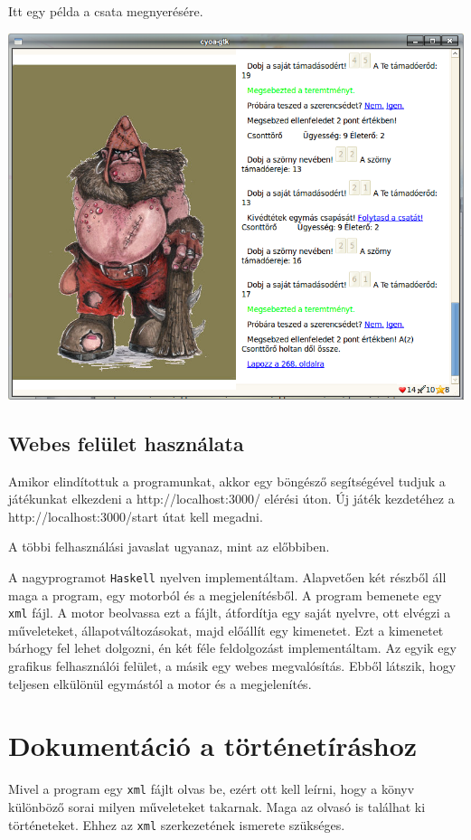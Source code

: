 \documentclass[12pt,a4paper,oneside]{report}
\newcommand{\proglang}{\texttt}
\begin{document}
        Itt egy példa a csata megnyerésére.
        
        \includegraphics[scale=0.5]{screenshot_014.png}

      \subsection{Webes felület használata}
        Amikor elindítottuk a programunkat, akkor egy böngésző
        segítségével tudjuk a játékunkat elkezdeni a
        http://localhost:3000/ elérési úton. Új játék kezdetéhez a
        http://localhost:3000/start útat kell megadni.

        A többi felhasználási javaslat ugyanaz, mint az előbbiben.
      
 A nagyprogramot \proglang{Haskell}
nyelven implementáltam. Alapvetően két részből áll maga a program, egy
motorból és a megjelenítésből. A program bemenete egy \proglang{xml}
fájl. A motor beolvassa ezt a fájlt, átfordítja egy saját nyelvre, ott
elvégzi a műveleteket, állapotváltozásokat, majd előállít egy
kimenetet. Ezt a kimenetet bárhogy fel lehet dolgozni, én két féle
feldolgozást implementáltam. Az egyik egy graf{}ikus felhasználói
felület, a másik egy webes megvalósítás. Ebből látszik, hogy teljesen
elkülönül egymástól a motor és a megjelenítés.

  \section{Dokumentáció a történetíráshoz}
    Mivel a program egy \proglang{xml} fájlt olvas be, ezért ott kell
    leírni, hogy a könyv különböző sorai milyen műveleteket
    takarnak. Maga az olvasó is találhat ki történeteket. Ehhez az
    \proglang{xml} szerkezetének ismerete szükséges.
\end{document}
